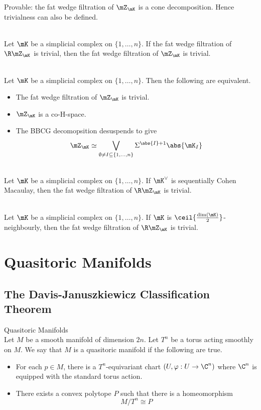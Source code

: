 \documentclass[a4paper]{article}
\begin{document}
Provable: the fat wedge filtration of $\mZ_\mK$ is a cone decomposition. Hence trivialness can also be defined. 

\begin{crl}{}{}\\
Let $\mK$ be a simplicial complex on $\{1,\dots,n\}$. If the fat wedge filtration of $\R\mZ_\mK$ is trivial, then the fat wedge filtration of $\mZ_\mK$ is trivial. 
\end{crl}

\begin{thm}{}{}\\
Let $\mK$ be a simplicial complex on $\{1,\dots,n\}$. Then the following are equivalent. 
\begin{itemize}
\item The fat wedge filtration of $\mZ_\mK$ is trivial. 
\item $\mZ_\mK$ is a co-H-space. 
\item The BBCG decomopsition desuspends to give $$\mZ_\mK\simeq\bigvee_{\emptyset\neq I\subseteq\{1,\dots,n\}}\Sigma^{\abs{I}+1}\abs{\mK_I}$$
\end{itemize}
\end{thm}

\begin{thm}{}{}\\
Let $\mK$ be a simplicial complex on $\{1,\dots,n\}$. If $\mK^\vee$ is sequentially Cohen Macaulay, then the fat wedge filtration of $\R\mZ_\mK$ is trivial. 
\end{thm}

\begin{thm}{}{}\\
Let $\mK$ be a simplicial complex on $\{1,\dots,n\}$. If $\mK$ is $\ceil{\frac{\dim(\mK)}{2}}$-neighbourly, then the fat wedge filtration of $\R\mZ_\mK$ is trivial. 
\end{thm}

\pagebreak
\section{Quasitoric Manifolds}
\subsection{The Davis-Januszkiewicz Classification Theorem}
\begin{defn}{Quasitoric Manifolds}{}\\
Let $M$ be a smooth manifold of dimension $2n$. Let $T^n$ be a torus acting smoothly on $M$. We say that $M$ is a quasitoric manifold if the following are true. 
\begin{itemize}
\item For each $p\in M$, there is a $T^n$-equivariant chart $(U,\varphi:U\to\C^n)$ where $\C^n$ is equipped with the standard torus action. 
\item There exists a convex polytope $P$ such that there is a homeomorphism $$M/T^n\cong P$$
\end{itemize}
\end{defn}
\end{document}
